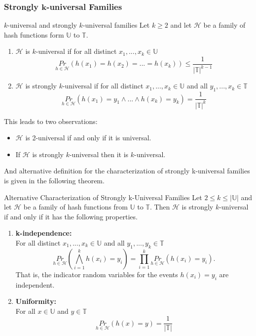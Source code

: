 \documentclass{panikzettel}
\begin{document}
\subsubsection{Strongly $\mathbf{k}$-universal Families}
\begin{defi}{$k$-universal and strongly $k$-universal families}
Let $k\geq 2$ and let $\mathcal{H}$ be a family of hash functions form $\mathbb{U}$ to $\mathbb{T}$.
\begin{enumerate}
\item $\mathcal{H}$ is $k$-universal if for all distinct $x_1,...,x_k\in\mathbb{U}$
\[
\underset{h\in\mathcal{H}}{Pr}(h(x_1)=h(x_2)=...=h(x_k))\leq \frac{1}{|\mathbb{T}|^{k-1}}
\]
\item $\mathcal{H}$ is strongly $k$-universal if for all distinct $x_1,...,x_k\in\mathbb{U}$ and all $y_1,...,x_k\in\mathbb{T}$
\[
\underset{h\in\mathcal{H}}{Pr}(h(x_1)=y_1\wedge...\wedge h(x_k)=y_k)=\frac{1}{|\mathbb{T}|^k}
\]
\end{enumerate}
\end{defi}
This leads to two observations:
\begin{itemize}
\item $\mathcal{H}$ is 2-universal if and only if it is universal.
\item If $\mathcal{H}$ is strongly $k$-universal then it is $k$-universal.
\end{itemize}

And alternative definition for the characterization of
strongly k-universal families is given in the following theorem.

\begin{theo}{Alternative Characterization of Strongly k-Universal Families}
Let $2\leq k\leq |\mathbb{U}|$ and let $\mathcal{H}$ be a family of hash functions from $\mathbb{U}$ to $\mathbb{T}$. Then $\mathcal{H}$ is strongly $k$-universal if and only if it has the following properties.
\begin{enumerate}
\item \textbf{k-independence:}\\
For all distinct $x_1,...,x_k\in\mathbb{U}$ and all $y_1,...,y_k\in\mathbb{T}$
\[
\underset{h\in\mathcal{H}}{Pr}\left( \bigwedge_{i=1}^k h(x_i)=y_i \right) = \prod_{i=1}^k \underset{h\in\mathcal{H}}{Pr}(h(x_i)=y_i).
\]
That is, the indicator random variables for the events
$h(x_i)=y_i$ are independent.
\item \textbf{Uniformity:}\\
For all $x\in\mathbb{U}$ and $y\in\mathbb{T}$
\[
\underset{h\in\mathcal{H}}{Pr} (h(x)=y)=\frac{1}{|\mathbb{T}|}
\]
\end{enumerate}
\end{theo}
\end{document}

